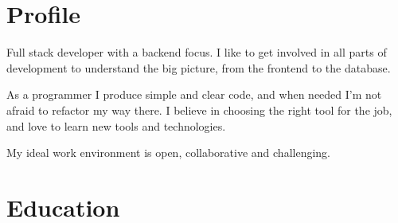 \documentclass[11pt,a4paper,sans]{moderncv}        %
\begin{document}
\makecvtitle

\section{Profile}
Full stack developer with a backend focus. I like to get involved in all parts of development to understand the big picture, from the frontend to the database.

As a programmer I produce simple and clear code, and when needed I’m not afraid to refactor my way there. I believe in choosing the right tool for the job, and love to learn new tools and technologies.

My ideal work environment is open, collaborative and challenging.

\section{Education}
\end{document}
